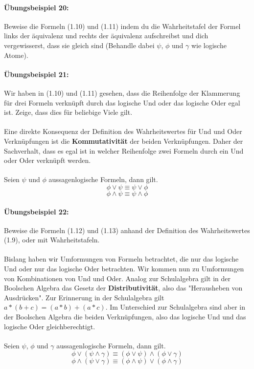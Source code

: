 \documentclass[11pt,a4paper,leqno]{report}
\numberwithin{equation}{chapter}
\begin{document}
\paragraph{\"Ubungsbeispiel 20:} Beweise die Formeln (1.10) und (1.11) indem du die Wahrheitstafel der Formel links der \"aquivalenz und rechts der \"aquivalenz aufschreibst und dich vergewisserst, dass sie gleich sind (Behandle dabei $\psi$, $\phi$ und $\gamma$ wie logische Atome).

\paragraph{\"Ubungsbeispiel 21:} Wir haben in (1.10) und (1.11) gesehen, dass die Reihenfolge der Klammerung f\"ur drei Formeln verkn\"upft durch das logische Und oder das logische Oder egal ist. Zeige, dass dies f\"ur beliebige Viele gilt.\\
\\
Eine direkte Konsequenz der Definition des Wahrheitswertes f\"ur Und und Oder Verkn\"upfungen ist die \textbf{Kommutativit\"at} der beiden Verkn\"upfungen. Daher der Sachverhalt, dass es egal ist in welcher Reihenfolge zwei Formeln durch ein Und oder Oder verkn\"upft werden.\\
\\
Seien $\psi$ und $\phi$ aussagenlogische Formeln, dann gilt.
\begin{equation}
\phi \vee \psi \equiv  \psi\vee \phi
\end{equation}
\begin{equation}
\phi \wedge \psi \equiv  \psi\wedge \phi
\end{equation}
\paragraph{\"Ubungsbeispiel 22:} Beweise die Formeln (1.12) und (1.13) anhand der Definition des Wahrheitswertes (1.9), oder mit Wahrheitstafeln.\\
\\
Bislang haben wir Umformungen von Formeln betrachtet, die nur das logische Und oder nur das logische Oder betrachten. Wir kommen nun zu Umformungen von Kombinationen von Und und Oder. Analog zur Schulalgebra gilt in der Boolschen Algebra das Gesetz der \textbf{Distributivit\"at}, also das "Herausheben von Ausdr\"ucken". Zur Erinnerung in der Schulalgebra gilt $a*(b + c) = (a*b) + (a*c)$. Im Unterschied zur Schulalgebra sind aber in der Boolschen Algebra die beiden Verkn\"upfungen, also das logische Und und das logische Oder gleichberechtigt. \\
\\
Seien $\psi$, $\phi$ und $\gamma$ aussagenlogische Formeln, dann gilt.
\begin{equation}
\phi \vee (\psi\wedge\gamma) \equiv (\phi \vee \psi)\wedge(\phi \vee \gamma)
\end{equation}
\begin{equation}
\phi \wedge (\psi\vee\gamma) \equiv (\phi \wedge \psi)\vee(\phi \wedge \gamma)
\end{equation}
\end{document}

